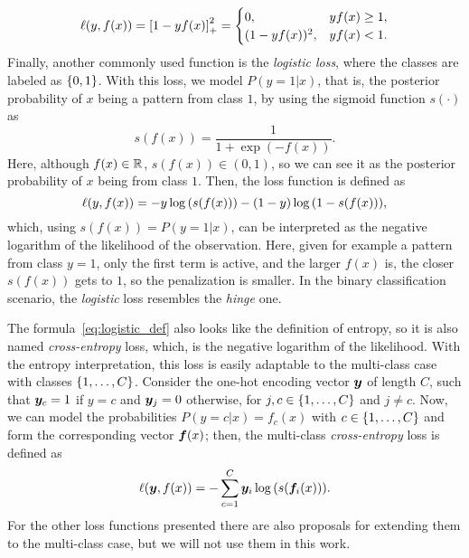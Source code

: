 \begin{equation}
    \label{eq:sqhinge_def}
    \lossf(y, f(x)) = \pospart{1 - yf(x)}^2 = 
    \begin{cases}
        0, & y f(x) \geq 1 ,\\
        (1 - y f(x))^2, & y f(x) < 1 .
    \end{cases}
\end{equation}
%
Finally, another commonly used function is the \emph{logistic loss}, where the classes are labeled as $\left\{0, 1\right\}$. With this loss, we model $P(y=1 \vert x)$, that is, the posterior probability of $x$ being a pattern from class $1$, by using the sigmoid function $s(\cdot)$ as 
$$ s(f(x)) = \frac{1}{1 + \exp{(-f(x))}} .$$
Here, although $f(x) \in \mathbb{R}$, $s(f(x)) \in (0, 1)$, so we can see it as the posterior probability of $x$ being from class $1$. Then, the loss function is defined as 
\begin{equation}
    \label{eq:logistic_def}
    \lossf(y, f(x)) = - y \log{(s(f(x)))} - (1 - y) \log{(1 - s(f(x)))} ,
\end{equation} 
which, using $s(f(x)) = P(y=1 \vert x)$, can be interpreted as the negative logarithm of the likelihood of the observation.
%
Here, given for example a pattern from class $y=1$, only the first term is active, and the larger $f(x)$ is, the closer $s(f(x))$ gets to $1$, so the penalization is smaller.
In the binary classification scenario, the \emph{logistic} loss resembles the \emph{hinge} one. 

The formula~\eqref{eq:logistic_def} also looks like the definition of entropy, so it is also named \emph{cross-entropy} loss, which, is the negative logarithm of the likelihood. 
With the entropy interpretation, this loss is easily adaptable to the multi-class case with classes $\left\{1, \ldots, C\right\}$. Consider the one-hot encoding vector $\bm{y}$ of length $C$, such that $\bm{y}_c = 1$ if $y=c$ and $\bm{y}_j = 0$ otherwise, for $j, c \in \left\{1, \ldots, C\right\}$ and $j \neq c$.
Now, we can model the probabilities $P(y=c \vert x) = f_c(x)$ with $c \in \left\{1, \ldots, C\right\}$ and form the corresponding vector $\bm{f}(x)$; then, the multi-class \emph{cross-entropy} loss is defined as 
\begin{equation}
    \label{eq:crossentropy_def}
    \lossf(\fv{y}, f(x)) = - \sum_{c=1}^C \fv{y}_i \log{(s(\fv{f}_i(x)))} .
\end{equation} 
For the other loss functions presented there are also proposals for extending them to the multi-class case, but we will not use them in this work.

